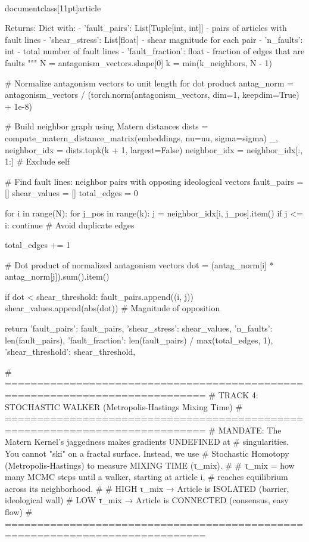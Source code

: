 \\documentclass[11pt]{article}
\begin{document}
\begin{CodeBlock}
    Returns:
        Dict with:
        - 'fault_pairs': List[Tuple[int, int]] - pairs of articles with fault lines
        - 'shear_stress': List[float] - shear magnitude for each pair
        - 'n_faults': int - total number of fault lines
        - 'fault_fraction': float - fraction of edges that are faults
    """
    N = antagonism_vectors.shape[0]
    k = min(k_neighbors, N - 1)

    # Normalize antagonism vectors to unit length for dot product
    antag_norm = antagonism_vectors / (torch.norm(antagonism_vectors, dim=1, keepdim=True) + 1e-8)

    # Build neighbor graph using Matern distances
    dists = compute_matern_distance_matrix(embeddings, nu=nu, sigma=sigma)
    _, neighbor_idx = dists.topk(k + 1, largest=False)
    neighbor_idx = neighbor_idx[:, 1:]  # Exclude self

    # Find fault lines: neighbor pairs with opposing ideological vectors
    fault_pairs = []
    shear_values = []
    total_edges = 0

    for i in range(N):
        for j_pos in range(k):
            j = neighbor_idx[i, j_pos].item()
            if j <= i:
                continue  # Avoid duplicate edges

            total_edges += 1

            # Dot product of normalized antagonism vectors
            dot = (antag_norm[i] * antag_norm[j]).sum().item()

            if dot < shear_threshold:
                fault_pairs.append((i, j))
                shear_values.append(abs(dot))  # Magnitude of opposition

    return {
        'fault_pairs': fault_pairs,
        'shear_stress': shear_values,
        'n_faults': len(fault_pairs),
        'fault_fraction': len(fault_pairs) / max(total_edges, 1),
        'shear_threshold': shear_threshold,
    }


# =============================================================================
# TRACK 4: STOCHASTIC WALKER (Metropolis-Hastings Mixing Time)
# =============================================================================
# MANDATE: The Matern Kernel's jaggedness makes gradients UNDEFINED at
# singularities. You cannot "ski" on a fractal surface. Instead, we use
# Stochastic Homotopy (Metropolis-Hastings) to measure MIXING TIME (τ_mix).
#
# τ_mix = how many MCMC steps until a walker, starting at article i,
#         reaches equilibrium across its neighborhood.
#
# HIGH τ_mix → Article is ISOLATED (barrier, ideological wall)
# LOW  τ_mix → Article is CONNECTED (consensus, easy flow)
# =============================================================================


\end{CodeBlock}
\end{document}
